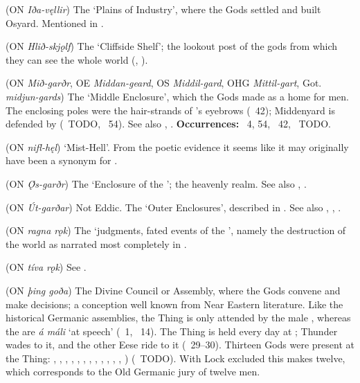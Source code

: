 \begin{itemize}
 (ON \emph{Iða-vęllir})
  The ‘Plains of Industry’, where the Gods settled and built Osyard.  Mentioned in \Voluspa.

 (ON \emph{Hlið-skjǫlf})
  The ‘Cliffside Shelf’; the lookout post of the gods from which they can see the whole world (\Grimnismal, \Skirnismal).

 (ON \emph{Mið-garðr}, OE \emph{Middan-geard}, OS \emph{Middil-gard}, OHG \emph{Mittil-gart}, Got. \emph{midjun-gards})
  The ‘Middle Enclosure’, which the Gods made as a home for men.  The enclosing poles were the hair-strands of ’s eyebrows (\Grimnismal\ 42); Middenyard is defended by  (\Harbardsljod\ TODO, \Voluspa\ 54).  See also , .
  \textbf{Occurrences:} \Voluspa\ 4, 54, \Grimnismal\ 42, \Harbardsljod\ TODO.

 (ON \emph{nifl-hęl})
  ‘Mist-Hell’. From the poetic evidence it seems like it may originally have been a synonym for .

 (ON \emph{Ǫ́s-garðr})
  The ‘Enclosure of the ’; the heavenly realm.  See also , .

 (ON \emph{Út-garðar})
  Not Eddic.  The ‘Outer Enclosures’, described in \Gylfaginning. See also , , .

 (ON \emph{ragna rǫk})
  The ‘judgments, fated events of the ’, namely the destruction of the world as narrated most completely in \Voluspa.

 (ON \emph{tíva rǫk})
  See .

 (ON \emph{þing goða})
  The Divine Council or Assembly, where the Gods convene and make decisions; a conception well known from Near Eastern literature.  Like the historical Germanic assemblies, the Thing is only attended by the male , whereas the  are \emph{á máli} ‘at speech’ (\Baldrsdraumar\ 1, \Thrymskvida\ 14).  The Thing is held every day at ; Thunder wades to it, and the other Eese ride to it (\Grimnismal\ 29–30).  Thirteen Gods were present at the Thing: , , , , , , , , , , , , ) (\Gylfaginning\ TODO).  With Lock excluded this makes twelve, which corresponds to the Old Germanic jury of twelve men.


\end{itemize}
